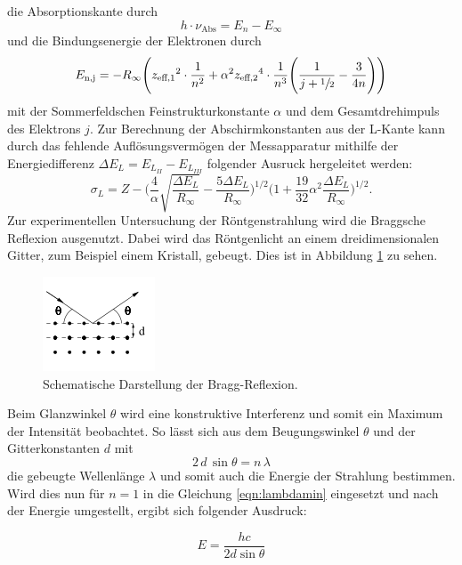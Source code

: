 die Absorptionskante durch
\begin{equation}
  h \cdot {\nu}_\text{Abs} = E_n - E_{\infty}
  \label{eqn:kante}
\end{equation}
und die Bindungsenergie der Elektronen durch
\begin{equation}
  E_\text{n,j} = - R_{\infty} \Biggl({z_\text{eff,1}}^2 \cdot \frac{1}{n^2} + {\alpha}^2 {z_\text{eff,2}}^4 \cdot \frac{1}{n^3} \Biggl(\frac{1}{j+\sfrac{1}{2}} - \frac{3}{4n} \Biggr) \Biggr)
  \label{eqn:feinstruktur}
\end{equation}
mit der Sommerfeldschen Feinstrukturkonstante $\alpha$ und dem Gesamtdrehimpuls des Elektrons $j$.
Zur Berechnung der Abschirmkonstanten aus der L-Kante kann durch das fehlende Auflösungsvermögen der Messapparatur mithilfe der Energiedifferenz $\Delta E_L = E_{L_{II}}- E_{L_{III}}$ folgender
Ausruck hergeleitet werden:
\begin{equation}
{\sigma}_L = Z - \Biggl(\frac{4}{\alpha} \sqrt{\frac{\Delta E_L}{R_{\infty}}} - \frac{5 \Delta E_L}{R_{\infty}} \Biggr)^{1/2} \Biggl(1+ \frac{19}{32} {\alpha}^2 \frac{\Delta E_L}{R_{\infty}} \Biggr)^{1/2} .
\label{eqn:sigmaL}
\end{equation}
Zur experimentellen Untersuchung der Röntgenstrahlung wird die Braggsche Reflexion ausgenutzt. Dabei wird das Röntgenlicht an einem dreidimensionalen Gitter, zum Beispiel einem Kristall, gebeugt.
Dies ist in Abbildung \ref{fig:braggreflexion} zu sehen.
\begin{figure}
  \centering
  \includegraphics{images/bragg.png}
  \caption{Schematische Darstellung der Bragg-Reflexion.\cite{sample}}
  \label{fig:braggreflexion}
\end{figure}
Beim Glanzwinkel $\theta$ wird eine konstruktive Interferenz und somit ein Maximum der Intensität beobachtet. So lässt sich aus dem Beugungswinkel $\theta$ und der Gitterkonstanten $d$ mit
\begin{equation}
  2 \, d \, \sin{\theta} = n \, \lambda
  \label{eqn:bragg}
\end{equation}
die gebeugte Wellenlänge $\lambda$ und somit auch die Energie der Strahlung bestimmen.
Wird dies nun für $n = 1$ in die Gleichung \eqref{eqn:lambdamin} eingesetzt und nach der Energie umgestellt, ergibt sich folgender Ausdruck:

\begin{equation}
  E = \frac{h c}{2 d \sin{\theta}}
  \label{eqn:Energie}
\end{equation}
